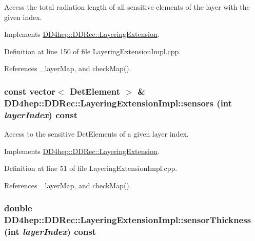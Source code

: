 Access the total radiation length of all sensitive elements of the layer with the given index. 

Implements \hyperlink{class_d_d4hep_1_1_d_d_rec_1_1_layering_extension_a1328587b943abe82353de131d9fac071}{DD4hep::DDRec::LayeringExtension}.

Definition at line 150 of file LayeringExtensionImpl.cpp.

References \_\-layerMap, and checkMap().\hypertarget{class_d_d4hep_1_1_d_d_rec_1_1_layering_extension_impl_a19380a0d054c47913fb3121457cef04d}{
\subsubsection[{sensors}]{\setlength{\rightskip}{0pt plus 5cm}const vector$<$ {\bf DetElement} $>$ \& DD4hep::DDRec::LayeringExtensionImpl::sensors (int {\em layerIndex}) const}}
\label{class_d_d4hep_1_1_d_d_rec_1_1_layering_extension_impl_a19380a0d054c47913fb3121457cef04d}


Access to the sensitive DetElements of a given layer index. 

Implements \hyperlink{class_d_d4hep_1_1_d_d_rec_1_1_layering_extension_a832e6f67c9e507b89f8f41d0a5cc0025}{DD4hep::DDRec::LayeringExtension}.

Definition at line 51 of file LayeringExtensionImpl.cpp.

References \_\-layerMap, and checkMap().\hypertarget{class_d_d4hep_1_1_d_d_rec_1_1_layering_extension_impl_adb4ae56a651abfa1758201c6562e2ee0}{
\subsubsection[{sensorThickness}]{\setlength{\rightskip}{0pt plus 5cm}double DD4hep::DDRec::LayeringExtensionImpl::sensorThickness (int {\em layerIndex}) const}}
\label{class_d_d4hep_1_1_d_d_rec_1_1_layering_extension_impl_adb4ae56a651abfa1758201c6562e2ee0}


